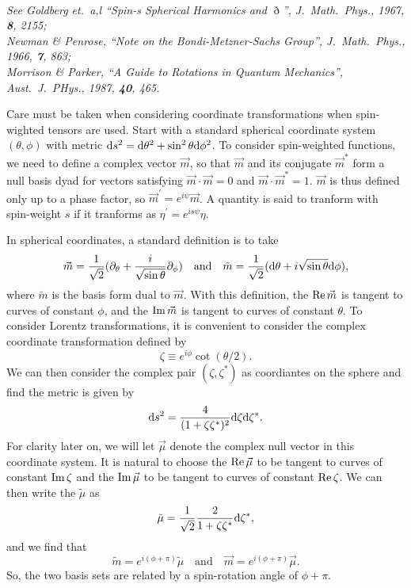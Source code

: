 \documentclass[11pt]{article}
\begin{document}
\newpage
{}\\ {\em See Goldberg et.\ a,l
  ``Spin-s Spherical Harmonics and $\eth$'', J.\ Math.\ Phys., 1967,
  {\bf 8}, 2155;\\ Newman \& Penrose, ``Note on the
  Bondi-Metzner-Sachs Group'', J.\ Math.\ Phys., 1966, {\bf 7}, 863;\\
  Morrison \& Parker, ``A Guide to Rotations in Quantum Mechanics'',
  Aust.\ J.\ PHys., 1987, {\bf 40}, 465.}
\vspace{0.25in}

Care must be taken when considering coordinate transformations when
spin-wighted tensors are used.  Start with a standard spherical
coordinate system $(\theta,\phi)$ with metric ${\rm d}s^2={\rm
  d}\theta^2+\sin^2\theta{\rm d}\phi^2$.  To consider spin-weighted
functions, we need to define a complex vector $\vec{m}$, so that
$\vec{m}$ and its conjugate $\vec{m}^*$ form a null basis dyad for
vectors satisfying $\vec{m}\cdot\vec{m}=0$ and
$\vec{m}\cdot\vec{m}^*=1$.  $\vec{m}$ is thus defined only up to a
phase factor, so $\vec{m}^\prime=e^{i\psi}\vec{m}$.  A quantity is
said to tranform with spin-weight $s$ if it tranforms as
$\eta^\prime=e^{is\psi}\eta$.

In spherical coordinates, a standard definition is to take
\begin{equation}
  \vec{m} = \frac1{\sqrt2}(\partial_\theta + \frac{i}{\sqrt{\sin\theta}}\partial_\phi)
\quad\mbox{and}\quad
  \tilde{m} = \frac1{\sqrt2}({\rm d}\theta + i\sqrt{\sin\theta}{\rm d}\phi),
\end{equation}
where $\tilde{m}$ is the basis form dual to $\vec{m}$.  With this
definition, the ${\rm Re}\,\vec{m}$ is tangent to curves of constant
$\phi$, and the ${\rm Im}\,\vec{m}$ is tangent to curves of constant
$\theta$.  To consider Lorentz transformations, it is convenient to
consider the complex coordinate transformation defined by
\begin{equation}
  \zeta\equiv e^{i\phi}\cot(\theta/2).
\end{equation}
We can then consider the complex pair $(\zeta,\zeta^*)$ as coordiantes
on the sphere and find the metric is given by
\begin{equation}
{\rm d}s^2 = \frac4{(1+\zeta\zeta^*)^2}{\rm d}\zeta{\rm d}\zeta^*.
\end{equation}
For clarity later on, we will let $\vec\mu$ denote the complex null
vector in this coordinate system.  It is natural to choose the ${\rm
  Re}\,\vec\mu$ to be tangent to curves of constant ${\rm Im}\,\zeta$
and the ${\rm Im}\,\vec\mu$ to be tangent to curves of constant ${\rm
  Re}\,\zeta$.  We can then write the $\tilde\mu$ as
\begin{equation}
  \tilde\mu = \frac1{\sqrt2}\frac2{1+\zeta\zeta^*}{\rm d}\zeta^*,
\end{equation}
and we find that
\begin{equation}
  \tilde{m} = e^{i(\phi+\pi)}\tilde\mu
\quad\mbox{and}\quad \vec{m} = e^{i(\phi+\pi)}\vec\mu.
\end{equation}
So, the two basis sets are related by a spin-rotation angle of $\phi+\pi$.
\end{document}
